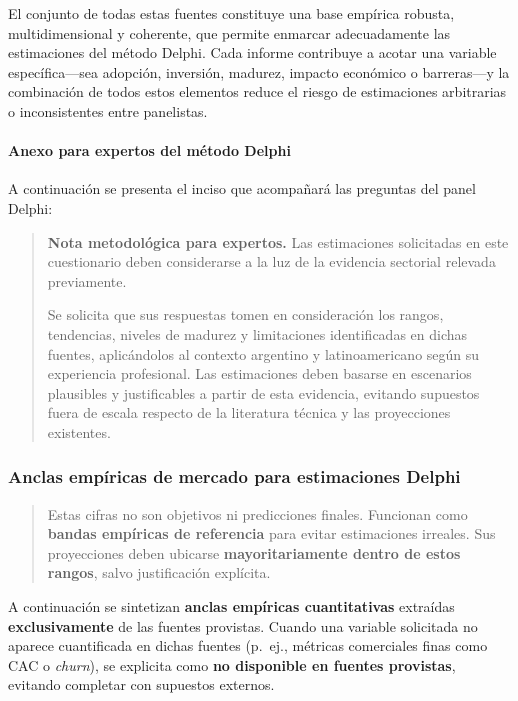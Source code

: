 El conjunto de todas estas fuentes constituye una base empírica robusta, multidimensional y coherente, que permite enmarcar adecuadamente las estimaciones del método Delphi. Cada informe contribuye a acotar una variable específica—sea adopción, inversión, madurez, impacto económico o barreras—y la combinación de todos estos elementos reduce el riesgo de estimaciones arbitrarias o inconsistentes entre panelistas.

\paragraph{Anexo para expertos del método Delphi}

A continuación se presenta el inciso que acompañará las preguntas del panel Delphi:

\begin{quote}
\textbf{Nota metodológica para expertos.} Las estimaciones solicitadas en este cuestionario deben considerarse a la luz de la evidencia sectorial relevada previamente.

Se solicita que sus respuestas tomen en consideración los rangos, tendencias, niveles de madurez y limitaciones identificadas en dichas fuentes, aplicándolos al contexto argentino y latinoamericano según su experiencia profesional. Las estimaciones deben basarse en escenarios plausibles y justificables a partir de esta evidencia, evitando supuestos fuera de escala respecto de la literatura técnica y las proyecciones existentes.
\end{quote}



\subsubsection{Anclas empíricas de mercado para estimaciones Delphi}

\begin{quote}
Estas cifras no son objetivos ni predicciones finales. Funcionan como \textbf{bandas empíricas de referencia} para evitar estimaciones irreales. Sus proyecciones deben ubicarse \textbf{mayoritariamente dentro de estos rangos}, salvo justificación explícita.
\end{quote}

\noindent A continuación se sintetizan \textbf{anclas empíricas cuantitativas} extraídas \textbf{exclusivamente} de las fuentes provistas. Cuando una variable solicitada no aparece cuantificada en dichas fuentes (p.\ ej., métricas comerciales finas como CAC o \textit{churn}), se explicita como \textbf{no disponible en fuentes provistas}, evitando completar con supuestos externos.


